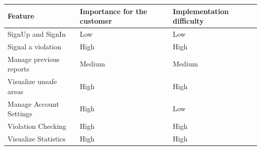     \begin{table}[]
        \begin{tabular}{|l|l|l|}
            \hline
            \textbf{Feature} & \textbf{Importance for the customer}  &
            \textbf{Implementation difficulty}  \\ \hline
            SignUp and SignIn & Low  & Low  \\ \hline
            Signal a violation & High  & High  \\ \hline
            Manage previous reports & Medium  & Medium  \\ \hline
            Visualize unsafe areas & High & High  \\ \hline
            Manage Account Settings & High & Low  \\ \hline
            Violation Checking & High & High  \\ \hline
            Visualize Statistics & High & High  \\ \hline
        \end{tabular}
    \end{table}
    
    \newpage
